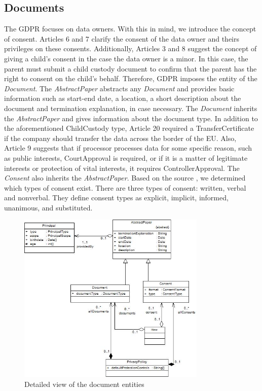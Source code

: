 \documentclass[11pt,english]{article}
\begin{document}
\subsection{Documents}
The GDPR focuses on data owners. With this in mind, we introduce the concept of consent. Articles 6 and 7 clarify the consent of the data owner and theirs privileges on these consents. Additionally, Articles 3 and 8 suggest the concept of giving a child's consent in the case the data owner is a minor. In this case, the parent must submit a child custody document to confirm that the parent has the right to consent on the child's behalf. Therefore, GDPR imposes the entity of the \emph{Document}. \newline The \emph{AbstractPaper} abstracts any \emph{Document} and provides basic information such as start-end date,  a location, a short description about the document and termination explanation, in case necessary. \newline  The \emph{Document} inherits the \emph{AbstractPaper} and gives information about the document type. In addition to the aforementioned ChildCustody type, Article 20 required a TransferCertificate if the company should transfer the data across the border of the EU. Also, Article 9 suggests that if processor processes data for some specific reason, such as public interests, CourtApproval is required, or if it is a matter of legitimate interests or protection of vital interests, it requires ControllerApproval. \newline The \emph{Consent} also inherits the \emph{AbstractPaper}. Based on the source \cite{consent}, we determined which types of consent exist. There are three types of consent: written, verbal and nonverbal. They define consent types as explicit, implicit, informed, unanimous, and substituted.
\begin{figure}[H]
    \centering
    \includegraphics[width=9cm,scale=0.5]{images/document.jpg}
    \caption{Detailed view of the document entities}
    \label{fig:Document}
\end{figure}
\end{document}
